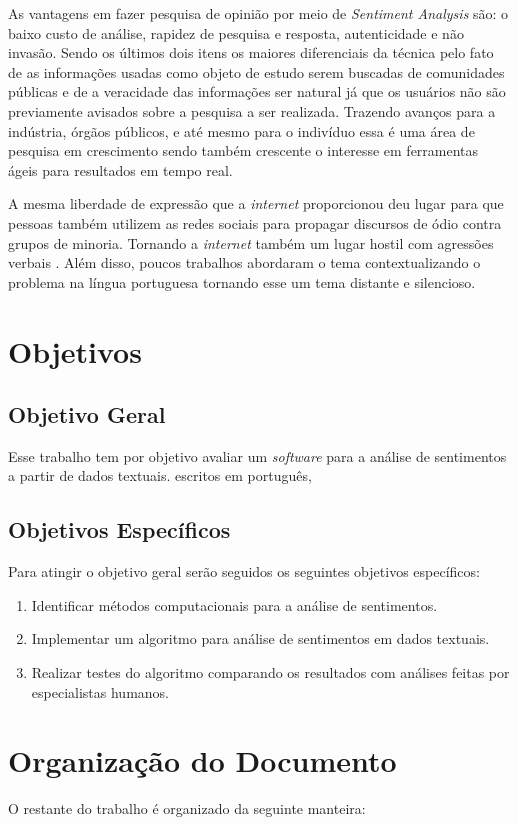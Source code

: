 As vantagens em fazer pesquisa de opinião por meio de \textit{Sentiment Analysis} são: o baixo custo de análise, rapidez de pesquisa e resposta, autenticidade e não invasão. Sendo os últimos dois itens os maiores diferenciais da técnica pelo fato de as informações usadas como objeto de estudo serem buscadas de comunidades públicas e de a veracidade das informações ser natural já que os usuários não são previamente avisados sobre a pesquisa a ser realizada. Trazendo avanços para a indústria, órgãos públicos, e até mesmo para o indivíduo essa é uma área de pesquisa em crescimento sendo também crescente o interesse em ferramentas ágeis para resultados em tempo real. 

A mesma liberdade de expressão que a \textit{internet} proporcionou deu lugar para que pessoas também utilizem as redes sociais para propagar discursos de ódio contra grupos de minoria. Tornando a \textit{internet} também um lugar hostil com agressões verbais \cite{Chetty2018}.  Além disso, poucos trabalhos abordaram o tema contextualizando o problema na língua portuguesa tornando esse um tema distante e silencioso.

\section{Objetivos}
\subsection{Objetivo Geral}    
    Esse trabalho tem por objetivo avaliar um \textit{software} para a análise de sentimentos a partir de dados textuais. escritos em português, 

\subsection{Objetivos Específicos}
    Para atingir o objetivo geral serão seguidos os seguintes objetivos específicos:
\begin{enumerate}
    \item Identificar métodos computacionais para a análise de sentimentos.
    \item Implementar um algoritmo para análise de sentimentos em dados textuais.
    \item Realizar testes do algoritmo comparando os resultados com análises feitas por especialistas humanos.
\end{enumerate}
	
\section{Organização do Documento}
O restante do trabalho é organizado da seguinte manteira:

